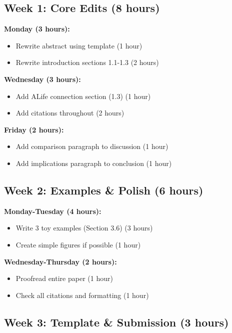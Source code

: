 \documentclass[11pt]{article}
\begin{document}
\subsection{Week 1: Core Edits (8 hours)}

\textbf{Monday (3 hours):}
\begin{itemize}[label=$\square$]
    \item Rewrite abstract using template (1 hour)
    \item Rewrite introduction sections 1.1-1.3 (2 hours)
\end{itemize}

\textbf{Wednesday (3 hours):}
\begin{itemize}[label=$\square$]
    \item Add ALife connection section (1.3) (1 hour)
    \item Add citations throughout (2 hours)
\end{itemize}

\textbf{Friday (2 hours):}
\begin{itemize}[label=$\square$]
    \item Add comparison paragraph to discussion (1 hour)
    \item Add implications paragraph to conclusion (1 hour)
\end{itemize}

\subsection{Week 2: Examples \& Polish (6 hours)}

\textbf{Monday-Tuesday (4 hours):}
\begin{itemize}[label=$\square$]
    \item Write 3 toy examples (Section 3.6) (3 hours)
    \item Create simple figures if possible (1 hour)
\end{itemize}

\textbf{Wednesday-Thursday (2 hours):}
\begin{itemize}[label=$\square$]
    \item Proofread entire paper (1 hour)
    \item Check all citations and formatting (1 hour)
\end{itemize}

\subsection{Week 3: Template \& Submission (3 hours)}
\end{document}
